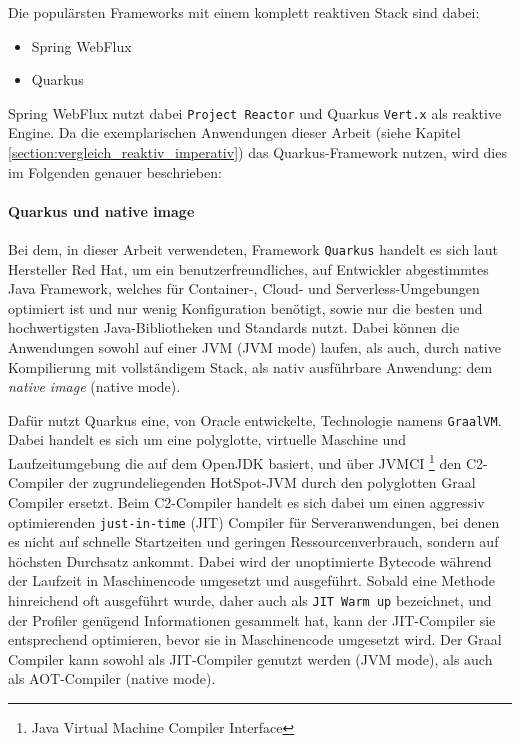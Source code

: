 Die populärsten Frameworks mit einem komplett reaktiven Stack sind dabei:

\begin{itemize}
    \item Spring WebFlux
    \item Quarkus
\end{itemize}

Spring WebFlux nutzt dabei \verb|Project Reactor| und Quarkus \verb|Vert.x| als reaktive Engine. \parencite{QuarkusReactiveGettingStarted}
Da die exemplarischen Anwendungen dieser Arbeit (siehe Kapitel \ref{section:vergleich_reaktiv_imperativ}) das Quarkus-Framework nutzen, wird dies
im Folgenden genauer beschrieben:
\paragraph{Quarkus und native image}

Bei dem, in dieser Arbeit verwendeten, Framework \verb|Quarkus| handelt es sich laut Hersteller Red Hat, um ein
benutzerfreundliches, auf Entwickler abgestimmtes Java Framework, welches für Container-, Cloud- und Serverless-Umgebungen optimiert ist und nur wenig
Konfiguration benötigt, sowie nur die besten und hochwertigsten Java-Bibliotheken und Standards nutzt.
Dabei können die Anwendungen sowohl auf einer JVM (JVM mode) laufen, als auch, durch native Kompilierung mit vollständigem Stack,
als nativ ausführbare Anwendung: dem \textit{native image} (native mode).

Dafür nutzt Quarkus eine, von Oracle entwickelte, Technologie namens \verb|GraalVM|.
Dabei handelt es sich um eine polyglotte, virtuelle Maschine und Laufzeitumgebung die auf dem OpenJDK basiert, und über
JVMCI \footnote{Java Virtual Machine Compiler Interface} den C2-Compiler der zugrundeliegenden HotSpot-JVM durch den
polyglotten Graal Compiler ersetzt.\parencite{GraalVM}
Beim C2-Compiler handelt es sich dabei um einen aggressiv optimierenden \verb|just-in-time| (JIT) Compiler für Serveranwendungen, bei denen es nicht auf
schnelle Startzeiten und geringen Ressourcenverbrauch, sondern auf höchsten Durchsatz ankommt.
Dabei wird der unoptimierte Bytecode während der Laufzeit in Maschinencode umgesetzt und ausgeführt. Sobald eine Methode hinreichend oft
ausgeführt wurde, daher auch als \verb|JIT Warm up| bezeichnet, und der Profiler genügend Informationen gesammelt hat, kann der JIT-Compiler
sie entsprechend optimieren, bevor sie in Maschinencode umgesetzt wird.
Der Graal Compiler kann sowohl als JIT-Compiler genutzt werden (JVM mode), als auch als AOT-Compiler (native mode).\newline

